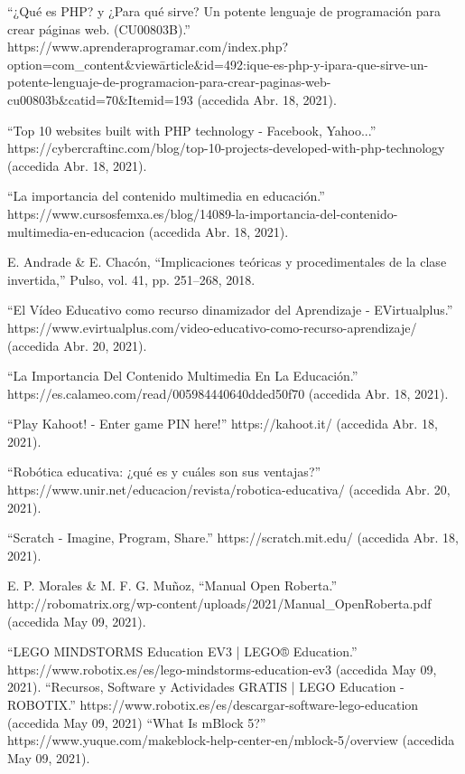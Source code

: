\begin{thebibliography}{69}
	``¿Qué es PHP? y ¿Para qué sirve? Un potente lenguaje de programación para crear páginas web. (CU00803B).” https://www.aprenderaprogramar.com/index.php?option=com\_content\&view\=article\&id=492:ique-es-php-y-ipara-que-sirve-un-potente-lenguaje-de-programacion-para-crear-paginas-web-cu00803b\&catid=70\&Itemid=193 (accedida Abr. 18, 2021).
  
	``Top 10 websites built with PHP technology - Facebook, Yahoo...” https://cybercraftinc.com/blog/top-10-projects-developed-with-php-technology (accedida Abr. 18, 2021).


 ``La importancia del contenido multimedia en educación.” https://www.cursosfemxa.es/blog/14089-la-importancia-del-contenido-multimedia-en-educacion (accedida Abr. 18, 2021).


 E. Andrade \& E. Chacón, ``Implicaciones teóricas y procedimentales de la clase invertida,” Pulso, vol. 41, pp. 251–268, 2018.

 ``El Vídeo Educativo como recurso dinamizador del Aprendizaje - EVirtualplus.” https://www.evirtualplus.com/video-educativo-como-recurso-aprendizaje/ (accedida Abr. 20, 2021).

	``La Importancia Del Contenido Multimedia En La Educación.” https://es.calameo.com/read/005984440640dded50f70 (accedida Abr. 18, 2021).

	``Play Kahoot! - Enter game PIN here!” https://kahoot.it/ (accedida Abr. 18, 2021).

 ``Robótica educativa: ¿qué es y cuáles son sus ventajas?” https://www.unir.net/educacion/revista/robotica-educativa/ (accedida Abr. 20, 2021).

 ``Scratch - Imagine, Program, Share.” https://scratch.mit.edu/ (accedida Abr. 18, 2021).

 	E. P. Morales \& M. F. G. Muñoz, ``Manual Open Roberta.” http://robomatrix.org/wp-content/uploads/2021/Manual\_OpenRoberta.pdf (accedida May 09, 2021).

 ``LEGO MINDSTORMS Education EV3 | LEGO® Education.” https://www.robotix.es/es/lego-mindstorms-education-ev3 (accedida May 09, 2021).
 ``Recursos, Software y Actividades GRATIS | LEGO Education - ROBOTIX.” https://www.robotix.es/es/descargar-software-lego-education (accedida May 09, 2021)
 ``What Is mBlock 5?” https://www.yuque.com/makeblock-help-center-en/mblock-5/overview (accedida May 09, 2021).



\end{thebibliography}
